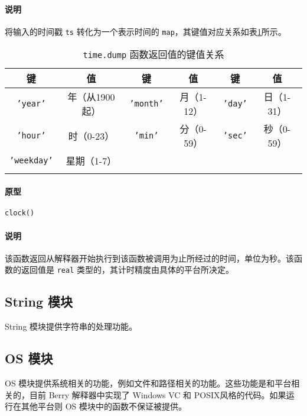\paragraph{说明}
将输入的时间戳 \texttt{ts} 转化为一个表示时间的 \texttt{map}，其键值对应关系如表\ref{tab::time_dump_map}所示。
\begin{table}[htb]
    \centering
    \setlength{\tabcolsep}{2mm}
    \begin{tabular}{cccccc} \Xhline{1pt}
        \textbf{键} & \textbf{值} & \textbf{键} & \textbf{值} & \textbf{键} & \textbf{值} \\ \hline
        \texttt{'year'} & 年（从1900起） & \texttt{'month'} & 月（1-12） & \texttt{'day'} & 日（1-31） \\
        \texttt{'hour'} & 时（0-23） & \texttt{'min'} & 分（0-59） & \texttt{'sec'} & 秒（0-59） \\
        \texttt{'weekday'} & 星期（1-7） \\
        \Xhline{1pt}
    \end{tabular}
    \caption{\texttt{time.dump} 函数返回值的键值关系}
    \label{tab::time_dump_map}
\end{table}


\paragraph{原型}
\begin{lstlisting}[language=berry, numbers=none]
clock()
\end{lstlisting}

\paragraph{说明}

该函数返回从解释器开始执行到该函数被调用为止所经过的时间，单位为秒。该函数的返回值是 \texttt{real} 类型的，其计时精度由具体的平台所决定。

\subsection{String 模块}

String 模块提供字符串的处理功能。

\subsection{OS 模块}

OS 模块提供系统相关的功能，例如文件和路径相关的功能。这些功能是和平台相关的，目前 Berry 解释器中实现了 Windows VC 和 POSIX风格的代码。如果运行在其他平台则 OS 模块中的函数不保证被提供。
